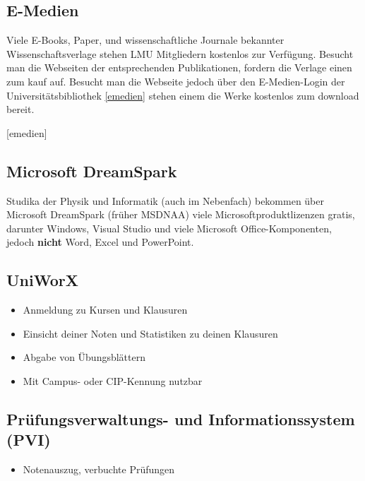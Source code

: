 \subsection*{E-Medien}
Viele E-Books, Paper, und wissenschaftliche Journale bekannter Wissenschaftsverlage stehen LMU Mitgliedern kostenlos zur Verfügung.
Besucht man die Webseiten der entsprechenden Publikationen, fordern die Verlage einen zum kauf auf.
Besucht man die Webseite jedoch über den E-Medien-Login der Universitätsbibliothek \ref{emedien} stehen einem die Werke kostenlos zum download bereit.
\begin{urlList}
	[emedien]
\end{urlList}

\subsection*{Microsoft DreamSpark \subjectList{\subjectI{}\subjectMI{}\subjectP{}}}
Studika der Physik und Informatik (auch im Nebenfach) bekommen über
Microsoft DreamSpark (früher MSDNAA) viele Microsoftproduktlizenzen
gratis, darunter Windows, Visual Studio und viele
Microsoft Office-Komponenten, jedoch \textbf{nicht} Word, Excel und PowerPoint.

\begin{urlList}
\end{urlList}

\subsection*{UniWorX\subjectList{\subjectI{}\subjectMI{}}}
\begin{itemize}
	\item Anmeldung zu Kursen und Klausuren
	\item Einsicht deiner Noten und Statistiken zu deinen Klausuren
	\item Abgabe von Übungsblättern
	\item Mit Campus- oder CIP-Kennung nutzbar
\end{itemize}
\begin{urlList}
\end{urlList}

\subsection*{Prüfungsverwaltungs- und Informationssystem (PVI)\subjectList{\subjectI{}\subjectMI{}}}
\begin{itemize}
	\item Notenauszug, verbuchte Prüfungen
\end{itemize}
\begin{urlList}
\end{urlList}




